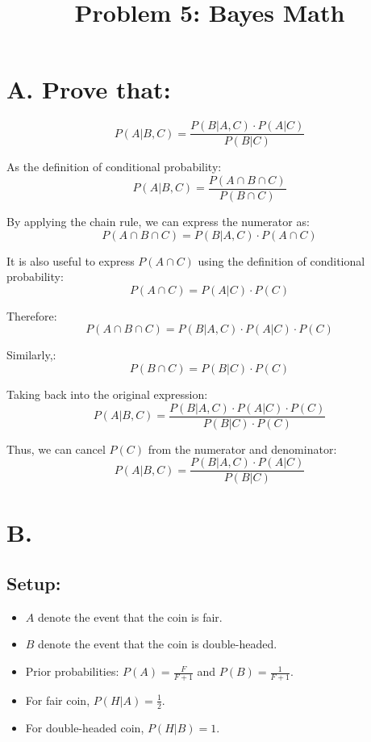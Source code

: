 \documentclass{article}
\title{Problem 5: Bayes Math}
\author{}
\date{}
\begin{document}
\maketitle

\section*{A. Prove that:}

\begin{equation}
P(A|B,C) = \frac{P(B|A,C) \cdot P(A|C)}{P(B|C)}
\end{equation}

As the definition of conditional probability:
\begin{equation}
P(A|B,C) = \frac{P(A \cap B \cap C)}{P(B \cap C)}
\end{equation}

By applying the chain rule, we can express the numerator as:
\begin{equation}
P(A \cap B \cap C) = P(B|A,C) \cdot P(A \cap C)
\end{equation}

It is also useful to express $P(A \cap C)$ using the definition of conditional probability:
\begin{equation}
P(A \cap C) = P(A|C) \cdot P(C)
\end{equation}

Therefore:
\begin{equation}
P(A \cap B \cap C) = P(B|A,C) \cdot P(A|C) \cdot P(C)
\end{equation}

Similarly,:
\begin{equation}
P(B \cap C) = P(B|C) \cdot P(C)
\end{equation}

Taking back into the original expression:
\begin{equation}
P(A|B,C) = \frac{P(B|A,C) \cdot P(A|C) \cdot P(C)}{P(B|C) \cdot P(C)}
\end{equation}

Thus, we can cancel $P(C)$ from the numerator and denominator:
\begin{equation}
P(A|B,C) = \frac{P(B|A,C) \cdot P(A|C)}{P(B|C)}
\end{equation}

\section*{B.}
\subsection*{Setup:}
\begin{itemize}
    \item $A$ denote the event that the coin is fair.
    \item $B$ denote the event that the coin is double-headed.
    \item Prior probabilities: $P(A) = \frac{F}{F+1}$ and $P(B) = \frac{1}{F+1}$.
    \item For fair coin, $P(H|A) = \frac{1}{2}$.
    \item For double-headed coin, $P(H|B) = 1$.
\end{itemize}
\end{document}
